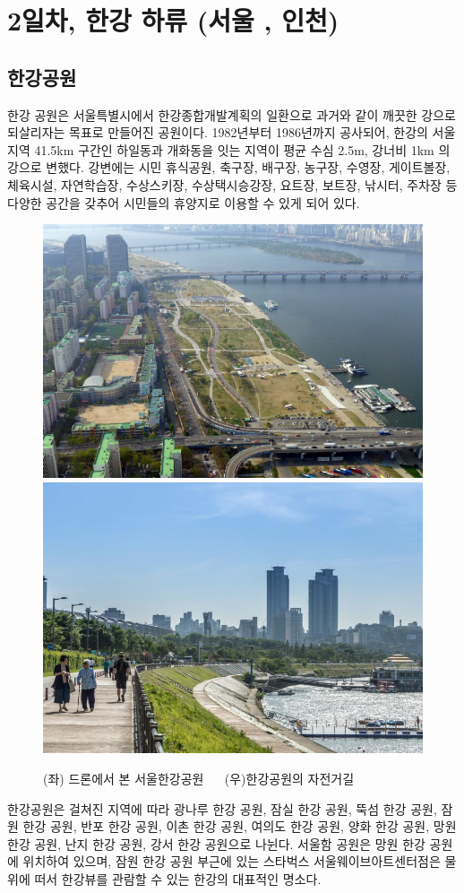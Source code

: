 \chapter{2일차, 한강 하류 (서울 , 인천)}
\section{한강공원}
한강 공원은 서울특별시에서 한강종합개발계획의 일환으로 과거와 같이 깨끗한 강으로
되살리자는 목표로 만들어진 공원이다. 1982년부터 1986년까지 공사되어, 한강의 서울
지역 41.5km 구간인 하일동과 개화동을 잇는 지역이 평균 수심 2.5m, 강너비 1km 의
강으로 변했다. 강변에는 시민 휴식공원, 축구장, 배구장, 농구장, 수영장, 게이트볼장, 
체육시설, 자연학습장, 수상스키장, 수상택시승강장, 요트장, 보트장, 낚시터, 주차장 등 다양한
공간을 갖추어 시민들의 휴양지로 이용할 수 있게 되어 있다.

\begin{figure}[ht]
    \centering
    \includegraphics[width=.45\textwidth]{e_img/ww_-000_low.jpg}
    \includegraphics[width=.45\textwidth]{e_img/ww_-001.jpg}
    \caption{(좌) 드론에서 본 서울한강공원 $\quad$ (우)한강공원의 자전거길}
    \label{fig:haryu1}
\end{figure}

한강공원은 걸쳐진 지역에 따라 광나루 한강 공원, 잠실 한강 공원, 뚝섬 한강 공원,
잠원 한강 공원, 반포 한강 공원, 이촌 한강 공원, 여의도 한강 공원, 양화 한강 공원, 
망원한강 공원, 난지 한강 공원, 강서 한강 공원으로 나뉜다. 서울함 공원은 망원 한강 공원에
위치하여 있으며, 잠원 한강 공원 부근에 있는 스타벅스 서울웨이브아트센터점은 물 위에 
떠서 한강뷰를 관람할 수 있는 한강의 대표적인 명소다.

